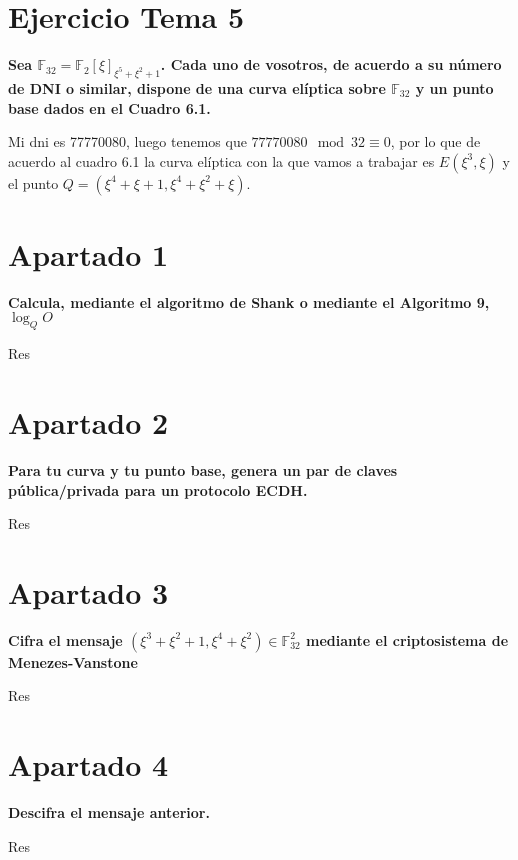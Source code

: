 \documentclass[a4paper]{article}
\title {\fbox{\Huge{\textbf{Ejercicio Tema 5}}}}
\author {\fbox{Ana Buendía Ruiz-Azuaga}}
\begin{document}
\maketitle


\section{Ejercicio Tema 5}

\textbf{Sea $\mathbb{F}_{32}=\mathbb{F}_{2}[\xi]_{\xi^5+\xi^2+1}$. Cada uno de vosotros, de acuerdo a su número de DNI o similar, dispone de una curva elíptica sobre $\mathbb{F}_{32}$ y un punto base dados en el Cuadro 6.1.}

Mi dni es 77770080, luego tenemos que $77770080 \mod 32 \equiv 0$, por lo que de acuerdo al cuadro 6.1 la curva elíptica con la que vamos a trabajar es $E(\xi^3, \xi)$ y el punto $Q=(\xi^4+\xi+1, \xi^4+\xi^2+\xi)$.

\section{Apartado 1}

\textbf{Calcula, mediante el algoritmo de Shank o mediante el Algoritmo 9, $\log_{Q}O$}

Res

\section{Apartado 2}

\textbf{Para  tu  curva  y  tu  punto  base,  genera  un  par  de  claves  pública/privada para un protocolo ECDH.}

Res

\section{Apartado 3}

\textbf{Cifra el mensaje $(\xi^3+\xi^2+1,\xi^4+\xi^2)\in \mathbb{F}^2_{32}$ mediante el criptosistema de Menezes-Vanstone}

Res

\section{Apartado 4}

\textbf{Descifra el mensaje anterior.}

Res
\end{document}
